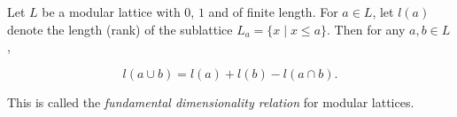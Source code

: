 Let $L$ be a modular lattice with $0$, $1$ and of finite length. For $a \in L$, let $l(a)$ denote the length (rank) of the sublattice $L_a = \{x \mid x \leq a\}$. Then for any $a, b \in L$,

$$l(a \cup b) = l(a) + l(b) - l(a \cap b).$$

This is called the \textit{fundamental dimensionality relation} for modular lattices.
